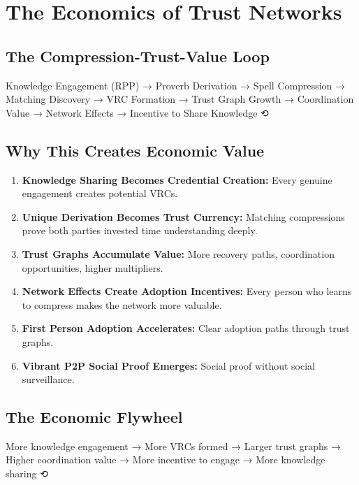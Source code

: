 \documentclass[
  11pt,
]{article}
\begin{document}
\section{The Economics of Trust
Networks}\label{the-economics-of-trust-networks}

\subsection{The Compression-Trust-Value
Loop}\label{the-compression-trust-value-loop}

Knowledge Engagement (RPP) → Proverb Derivation → Spell Compression →
Matching Discovery → VRC Formation → Trust Graph Growth → Coordination
Value → Network Effects → Incentive to Share Knowledge ⟲

\subsection{Why This Creates Economic
Value}\label{why-this-creates-economic-value}

\begin{enumerate}
\def\labelenumi{\arabic{enumi}.}
\item
  \textbf{Knowledge Sharing Becomes Credential Creation:} Every genuine
  engagement creates potential VRCs.
\item
  \textbf{Unique Derivation Becomes Trust Currency:} Matching
  compressions prove both parties invested time understanding deeply.
\item
  \textbf{Trust Graphs Accumulate Value:} More recovery paths,
  coordination opportunities, higher multipliers.
\item
  \textbf{Network Effects Create Adoption Incentives:} Every person who
  learns to compress makes the network more valuable.
\item
  \textbf{First Person Adoption Accelerates:} Clear adoption paths
  through trust graphs.
\item
  \textbf{Vibrant P2P Social Proof Emerges:} Social proof without social
  surveillance.
\end{enumerate}

\subsection{The Economic Flywheel}\label{the-economic-flywheel}

More knowledge engagement → More VRCs formed → Larger trust graphs →
Higher coordination value → More incentive to engage → More knowledge
sharing ⟲
\end{document}
